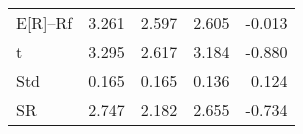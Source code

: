 \begin{tabular}{lrrrr}
\toprule
\midrule
E[R]--Rf & 3.261 & 2.597 & 2.605 & -0.013 \\
t & 3.295 & 2.617 & 3.184 & -0.880 \\
Std & 0.165 & 0.165 & 0.136 & 0.124 \\
SR & 2.747 & 2.182 & 2.655 & -0.734 \\
\bottomrule
\end{tabular}
